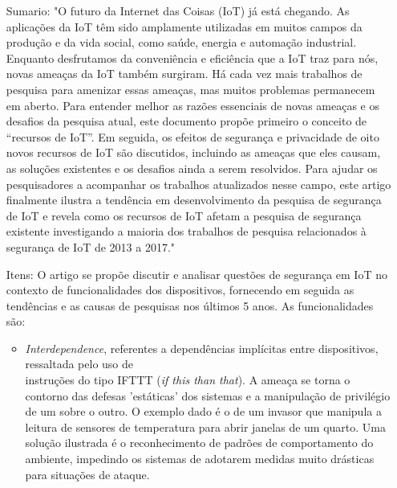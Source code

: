 \documentclass[letterpaper,11pt]{texMemo} %
\begin{document}
\maketitle %


\begin{itemize}
	\item[Sumario:] "O futuro da Internet das Coisas (IoT) já está chegando. As aplicações da IoT têm sido amplamente utilizadas em muitos campos da produção e da vida social, como saúde, energia e automação industrial. Enquanto desfrutamos da conveniência e eficiência que a IoT traz para nós, novas ameaças da IoT também surgiram. Há cada vez mais trabalhos de pesquisa para amenizar essas ameaças, mas muitos problemas permanecem em aberto. Para entender melhor as razões essenciais de novas ameaças e os desafios da pesquisa atual, este documento propõe primeiro o conceito de “recursos de IoT”. Em seguida, os efeitos de segurança e privacidade de oito novos recursos de IoT são discutidos, incluindo as ameaças que eles causam, as soluções existentes e os desafios ainda a serem resolvidos. Para ajudar os pesquisadores a acompanhar os trabalhos atualizados nesse campo, este artigo finalmente ilustra a tendência em desenvolvimento da pesquisa de segurança de IoT e revela como os recursos de IoT afetam a pesquisa de segurança existente investigando a maioria dos trabalhos de pesquisa relacionados à segurança de IoT de 2013 a 2017."
	\item[Itens:] O artigo se propõe discutir e analisar questões de segurança em IoT no contexto de funcionalidades dos dispositivos, fornecendo em seguida as tendências e as causas de pesquisas nos últimos 5 anos. As funcionalidades são:
	\begin{itemize}
		\item \textit{Interdependence}, referentes a dependências implícitas entre dispositivos, ressaltada pelo uso de\\
		 instruções do tipo IFTTT (\textit{if this than that}). A ameaça se torna o contorno das defesas 'estáticas' dos sistemas e a manipulação de privilégio de um sobre o outro. O exemplo dado é o de um invasor que manipula a leitura de sensores de temperatura para abrir janelas de um quarto. Uma solução ilustrada é o reconhecimento de padrões de comportamento do ambiente, impedindo os sistemas de adotarem medidas muito drásticas para situações de ataque.

\end{itemize}
\end{itemize}
\end{document}
